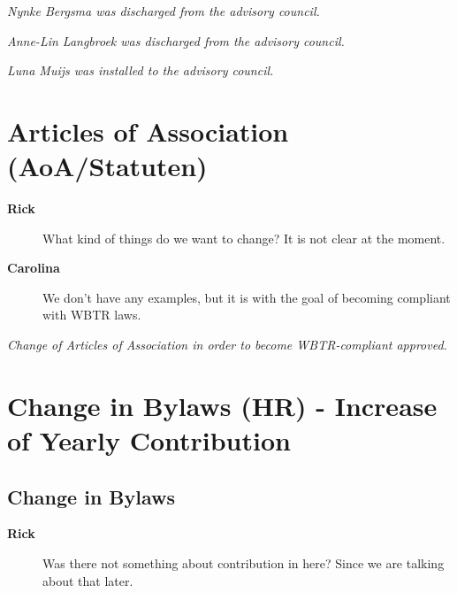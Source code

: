 \documentclass[12pt, a4paper]{article}
\newcommand{\speak}[2]{\begin{description}\item[\textbf{#1}]#2\end{description}}
\begin{document}



\textit{Nynke Bergsma was discharged from the advisory council.}

\textit{Anne-Lin Langbroek was discharged from the advisory council.}

\textit{Luna Muijs was installed to the advisory council.}




\section{Articles of Association (AoA/Statuten)}



\speak{Rick}{What kind of things do we want to change? It is not clear at the moment.}

\speak{Carolina}{We don't have any examples, but it is with the goal of becoming compliant with WBTR laws.}



\textit{Change of Articles of Association in order to become WBTR-compliant approved.}


\section{Change in Bylaws (HR) - Increase of Yearly Contribution}

\subsection{Change in Bylaws}

\speak{Rick}{Was there not something about contribution in here? Since we are talking about that later.}
\end{document}
